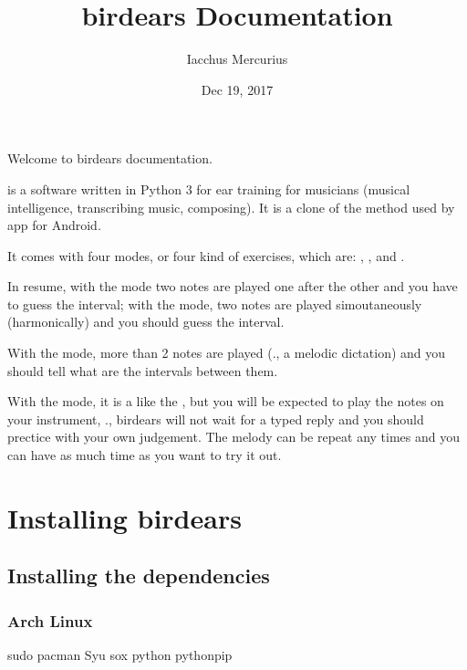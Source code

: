 \documentclass[letterpaper,10pt,english]{sphinxmanual}
\title{birdears Documentation}
\date{Dec 19, 2017}
\author{Iacchus Mercurius}
\begin{document}
\maketitle
\sphinxtableofcontents
{}\label{\detokenize{index::doc}}


Welcome to birdears documentation.

 is a software written in Python 3 for ear training for
musicians (musical intelligence, transcribing music, composing). It is a
clone of the method used by 
app for Android.

It comes with four modes, or four kind of exercises, which are:
, ,  and .

In resume, with the  mode two notes are played one after the
other and you have to guess the interval; with the  mode,
two notes are played simoutaneously (harmonically) and you should guess
the interval.

With the  mode, more than 2 notes are played (., a
melodic dictation) and you should tell what are the intervals between
them.

With the  mode, it is a like the , but you will
be expected to play the notes on your instrument, ., birdears will
not wait for a typed reply and you should prectice with your own
judgement. The melody can be repeat any times and you can have as much
time as you want to try it out.


\chapter{Installing birdears}
\label{\detokenize{installing:birdears-documentation}}\label{\detokenize{installing::doc}}\label{\detokenize{installing:installing-birdears}}

\section{Installing the dependencies}
\label{\detokenize{installing:installing-the-dependencies}}

\subsection{Arch Linux}
\label{\detokenize{installing:arch-linux}}
\begin{sphinxVerbatim}[commandchars=\\\{\}]
sudo pacman \PYGZhy{}Syu sox python python\PYGZhy{}pip
\end{sphinxVerbatim}
\end{document}
